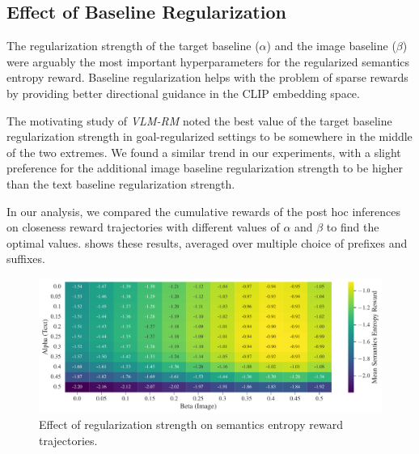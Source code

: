 \subsection{Effect of Baseline Regularization}
\label{sec:reg-alpha-beta}

The regularization strength of the target baseline (\(\alpha\)) and the image baseline (\(\beta\)) were arguably the most important hyperparameters for the regularized semantics entropy reward.
Baseline regularization helps with the problem of sparse rewards by providing better directional guidance in the CLIP embedding space.

The motivating study of \emph{VLM-RM} noted the best value of the target baseline regularization strength in goal-regularized settings to be somewhere in the middle of the two extremes.
We found a similar trend in our experiments, with a slight preference for the additional image baseline regularization strength to be higher than the text baseline regularization strength.

In our analysis, we compared the cumulative rewards of the post hoc inferences on closeness reward trajectories with different values of \(\alpha\) and \(\beta\) to find the optimal values.
 shows these results, averaged over multiple choice of prefixes and suffixes.

\begin{figure}[H]
    \centering
    \includegraphics[width=\textwidth]{images/alpha_beta_temp12avg_noneg.pdf}
    \caption{Effect of regularization strength on semantics entropy reward trajectories.}
    \label{fig:clip-alpha-beta}
\end{figure}



